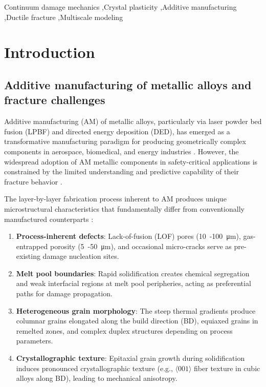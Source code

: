 \begin{frontmatter}
\begin{keyword}
Continuum damage mechanics \sep Crystal plasticity \sep Additive manufacturing \sep Ductile fracture \sep Multiscale modeling
\end{keyword}

\end{frontmatter}

\section{Introduction}

\subsection{Additive manufacturing of metallic alloys and fracture challenges}

Additive manufacturing (AM) of metallic alloys, particularly via laser powder bed fusion (LPBF) and directed energy deposition (DED), has emerged as a transformative manufacturing paradigm for producing geometrically complex components in aerospace, biomedical, and energy industries \cite{debroy2018additive,herzog2016additive}. However, the widespread adoption of AM metallic components in safety-critical applications is constrained by the limited understanding and predictive capability of their fracture behavior \cite{seifi2017overview}.

The layer-by-layer fabrication process inherent to AM produces unique microstructural characteristics that fundamentally differ from conventionally manufactured counterparts \cite{thijs2010study,suryawanshi2017mechanical}:

\begin{enumerate}\def\labelenumi{(\roman{enumi})}
    \item \textbf{Process-inherent defects}: Lack-of-fusion (LOF) pores (\SI{10}{-}\SI{100}{\micro\meter}), gas-entrapped porosity (\SI{5}{-}\SI{50}{\micro\meter}), and occasional micro-cracks serve as pre-existing damage nucleation sites.
    \item \textbf{Melt pool boundaries}: Rapid solidification creates chemical segregation and weak interfacial regions at melt pool peripheries, acting as preferential paths for damage propagation.
    \item \textbf{Heterogeneous grain morphology}: The steep thermal gradients produce columnar grains elongated along the build direction (BD), equiaxed grains in remelted zones, and complex duplex structures depending on process parameters.
    \item \textbf{Crystallographic texture}: Epitaxial grain growth during solidification induces pronounced crystallographic texture (e.g., $\langle001\rangle$ fiber texture in cubic alloys along BD), leading to mechanical anisotropy.
\end{enumerate}

